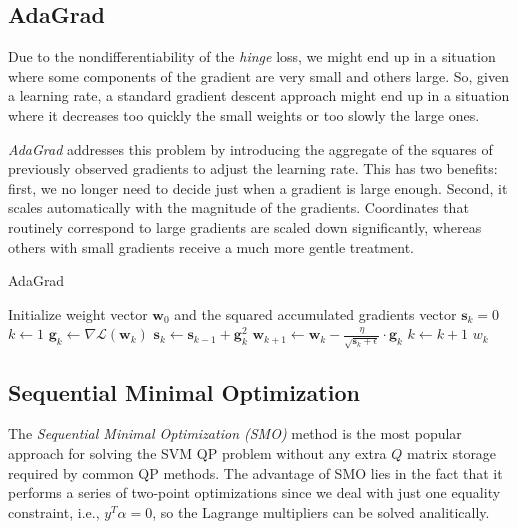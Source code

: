 \subsection{AdaGrad}

Due to the nondifferentiability of the \emph{hinge} loss, we might end up in a situation where some components of the gradient are very small and others large. So, given a learning rate, a standard gradient descent approach might end up in a situation where it decreases too quickly the small weights or too slowly the large ones.

\emph{AdaGrad} \cite{duchi2011adaptive} addresses this problem by introducing the aggregate of the squares of previously observed gradients to adjust the learning rate. This has two benefits: first, we no longer need to decide just when a gradient is large enough. Second, it scales automatically with the magnitude of the gradients. Coordinates that routinely correspond to large gradients are scaled down significantly, whereas others with small gradients receive a much more gentle treatment.

\begin{algorithm}[H]
	\caption{AdaGrad}
	\label{alg:adagrad}
	\begin{algorithmic}
			\State Initialize weight vector $\textbf{w}_0$ and the squared accumulated gradients vector $\textbf{s}_k = 0$
			\State $k \gets 1$
				\State $\textbf{g}_k \gets \nabla \mathcal{L}(\textbf{w}_k)$
				\State $\textbf{s}_k \gets \textbf{s}_{k-1} + \textbf{g}_k^2$
				\State $\textbf{w}_{k+1} \gets \textbf{w}_k - \displaystyle \frac{\eta}{\sqrt{\textbf{s}_k + \epsilon}} \cdot \textbf{g}_k$
				\State $k \gets k + 1$
			\EndWhile
			\State \Return $w_k$
		\EndFunction
	\end{algorithmic}
\end{algorithm}

\subsection{Sequential Minimal Optimization}

The \emph{Sequential Minimal Optimization (SMO)} \cite{platt1998sequential} method is the most popular approach for solving the SVM QP problem without any extra $Q$ matrix storage required by common QP methods. The advantage of SMO lies in the fact that it performs a series of two-point optimizations since we deal with just one equality constraint, i.e., $y^T \alpha=0$, so the Lagrange multipliers can be solved analitically.


